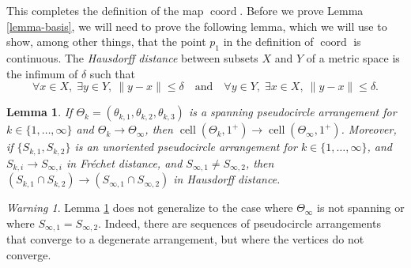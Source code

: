 \documentclass[JEP,XML,SOM,Unicode,NoFloatCountersInSection,published]{cedram}
\newcommand{\quand}{\quad\text{and}\quad}
\newtheorem{lemma}[theorem]{Lemma}
\theoremstyle{remark}
\newtheorem{warning}[theorem]{Warning}
\let\df\emph
\DeclareMathOperator{\cell}{cell}
\DeclareMathOperator{\coord}{coord}
\begin{document}
This completes the definition of the map $\coord$. Before we prove Lemma \ref{lemma-basis}, we will need to prove the following lemma, which we will use to show, among other things, that the point $p_1$ in the definition of $\coord$ is continuous.
The \df{Hausdorff distance} between subsets $X$ and $Y$ of a metric space is the infimum of $\delta$ such that
\[
\forall x \in X,\; \exists y \in Y,\ \|y-x\| \leq \delta \quand\forall y \in Y,\; \exists x \in X,\ \|y-x\| \leq \delta .
\]

\begin{lemma}\label{lemma-vertex}
If $\Theta_k = (\theta_{k,1},\theta_{k,2},\theta_{k,3})$ is a spanning pseudocircle arrangement for $k\in \{1,\dots,\infty\}$ and $\Theta_k \to \Theta_\infty$, then $\cell(\Theta_k,1^+) \to \cell(\Theta_\infty,1^+)$.
Moreover, if $\{S_{k,1}, S_{k,2}\}$ is an unoriented pseudocircle arrangement for $k\in \{1,\dots,\infty\}$, and $S_{k,i} \to S_{\infty,i}$ in Fréchet distance, and $S_{\infty,1}\neq S_{\infty,2}$, then $(S_{k,1}\cap S_{k,2}) \to (S_{\infty,1}\cap S_{\infty,2})$ in Hausdorff distance.
\end{lemma}

\begin{warning}
Lemma \ref{lemma-vertex} does not generalize to the case where $\Theta_\infty$ is not spanning or where $S_{\infty,1} = S_{\infty,2}$.
Indeed, there are sequences of pseudocircle arrangements that converge to a degenerate arrangement, but where the vertices do not converge.
\end{warning}
\end{document}
